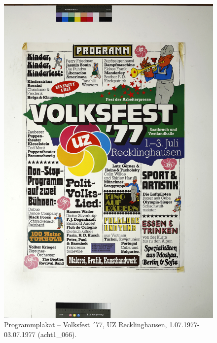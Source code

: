 \documentclass[a4paper,12pt,ngerman]{article}
\begin{document}
\newpage
\begin{figure}[ht]
\includegraphics[width=\linewidth]{Abbildung_2_(acht1_066)}
\centering
\caption{Programmplakat -- Volksfest ´77, UZ Recklinghausen, 1.07.1977-03.07.1977 (acht1\_066).}
\end{figure}
\end{document}
